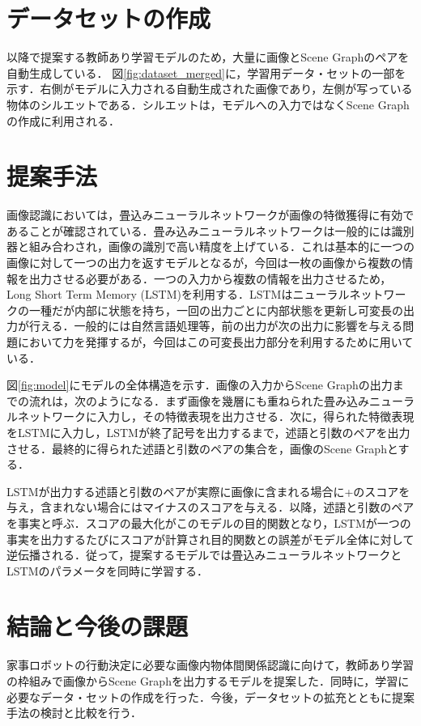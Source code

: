 \section{データセットの作成}
以降で提案する教師あり学習モデルのため，大量に画像とScene Graphのペアを自動生成している．
図\ref{fig:dataset_merged}に，学習用データ・セットの一部を示す．右側がモデルに入力される自動生成された画像であり，左側が写っている物体のシルエットである．シルエットは，モデルへの入力ではなくScene Graphの作成に利用される．
\section{提案手法}
画像認識においては，畳込みニューラルネットワークが画像の特徴獲得に有効であることが確認されている．畳み込みニューラルネットワークは一般的には識別器と組み合わされ，画像の識別で高い精度を上げている．これは基本的に一つの画像に対して一つの出力を返すモデルとなるが，今回は一枚の画像から複数の情報を出力させる必要がある．一つの入力から複数の情報を出力させるため，Long Short Term Memory (LSTM)\cite{lstm}を利用する．LSTMはニューラルネットワークの一種だが内部に状態を持ち，一回の出力ごとに内部状態を更新し可変長の出力が行える．一般的には自然言語処理等，前の出力が次の出力に影響を与える問題において力を発揮するが，今回はこの可変長出力部分を利用するために用いている．

図\ref{fig:model}にモデルの全体構造を示す．画像の入力からScene Graphの出力までの流れは，次のようになる．まず画像を幾層にも重ねられた畳み込みニューラルネットワークに入力し，その特徴表現を出力させる．次に，得られた特徴表現をLSTMに入力し，LSTMが終了記号を出力するまで，述語と引数のペアを出力させる．最終的に得られた述語と引数のペアの集合を，画像のScene Graphとする．

LSTMが出力する述語と引数のペアが実際に画像に含まれる場合に+のスコアを与え，含まれない場合にはマイナスのスコアを与える．以降，述語と引数のペアを事実と呼ぶ．スコアの最大化がこのモデルの目的関数となり，LSTMが一つの事実を出力するたびにスコアが計算され目的関数との誤差がモデル全体に対して逆伝播される．従って，提案するモデルでは畳込みニューラルネットワークとLSTMのパラメータを同時に学習する．
\section{結論と今後の課題}
家事ロボットの行動決定に必要な画像内物体間関係認識に向けて，教師あり学習の枠組みで画像からScene Graphを出力するモデルを提案した．同時に，学習に必要なデータ・セットの作成を行った．今後，データセットの拡充とともに提案手法の検討と比較を行う．


